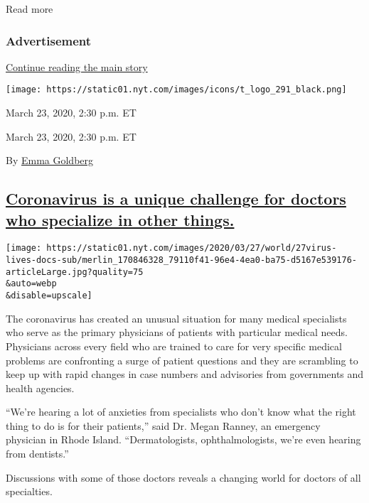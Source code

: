 Read more

\hypertarget{advertisement-4}{%
\subsubsection{Advertisement}\label{advertisement-4}}

\protect\hyperlink{after-dfp-ad-mid5}{Continue reading the main story}

\texttt{[image: https://static01.nyt.com/images/icons/t\_logo\_291\_black.png]}

March 23, 2020, 2:30 p.m. ET

March 23, 2020, 2:30 p.m. ET

By \href{https://www.nytimes.com/by/emma-goldberg}{Emma Goldberg}

\hypertarget{coronavirus-is-a-unique-challenge-for-doctors-who-specialize-in-other-things}{%
\subsection{\texorpdfstring{\protect\hyperlink{coronavirus-is-a-unique-challenge-for-doctors-who-specialize-in-other-things}{Coronavirus
is a unique challenge for doctors who specialize in other
things.}}{Coronavirus is a unique challenge for doctors who specialize in other things.}}\label{coronavirus-is-a-unique-challenge-for-doctors-who-specialize-in-other-things}}

\texttt{[image: https://static01.nyt.com/images/2020/03/27/world/27virus-lives-docs-sub/merlin\_170846328\_79110f41-96e4-4ea0-ba75-d5167e539176-articleLarge.jpg?quality=75\\\&auto=webp\\\&disable=upscale]}

The coronavirus has created an unusual situation for many medical
specialists who serve as the primary physicians of patients with
particular medical needs. Physicians across every field who are trained
to care for very specific medical problems are confronting a surge of
patient questions and they are scrambling to keep up with rapid changes
in case numbers and advisories from governments and health agencies.

``We're hearing a lot of anxieties from specialists who don't know what
the right thing to do is for their patients,'' said Dr. Megan Ranney, an
emergency physician in Rhode Island. ``Dermatologists, ophthalmologists,
we're even hearing from dentists.''

Discussions with some of those doctors reveals a changing world for
doctors of all specialties.


